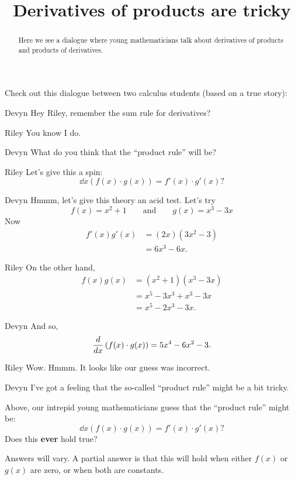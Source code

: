 \documentclass{ximera}
\title[Break-Ground:]{Derivatives of products are tricky}
\begin{document}
\begin{abstract}
Here we see a dialogue where young mathematicians talk about
derivatives of products and products of derivatives.
\end{abstract}
\maketitle

Check out this dialogue between two calculus students (based on a true
story):

\begin{dialogue}
\item[Devyn] Hey Riley, remember the sum rule for derivatives?
\item[Riley] You know I do.
\item[Devyn] What do you think that the ``product rule'' will be?
\item[Riley] Let's give this a spin:
  \[
  \dd{x} \left(f(x)\cdot g(x)\right) = f'(x) \cdot g'(x)?
  \]
\item[Devyn] Hmmm, let's give this theory an acid test. Let's try
  \[
  f(x) = x^2+1\qquad\text{and}\qquad g(x) = x^3-3x
  \]
  Now
  \begin{align*}
    f'(x)g'(x) &= (2x)(3x^2-3)\\
    &= 6x^3-6x.
  \end{align*}
\item[Riley] On the other hand,
  \begin{align*}
    f(x)g(x) &= (x^2+1)(x^3-3x)\\
    &=x^5-3x^3+x^3-3x\\
    &=x^5-2x^3-3x.
  \end{align*} 
\item[Devyn] And so, 
  \[
  \frac{d}{dx} \left(f(x) \cdot g(x)\right) = 5x^4-6x^2-3.
  \]
\item[Riley] Wow. Hmmm. It looks like our guess was incorrect.
\item[Devyn] I've got a feeling that the so-called ``product rule''
  might be a bit tricky.
\end{dialogue}

\begin{problem}
  Above, our intrepid young mathematicians guess that the ``product rule'' might be:
  \[
  \dd{x} \left(f(x)\cdot g(x)\right) = f'(x) \cdot g'(x)?
  \]
  Does this \textbf{ever} hold true?
  \begin{freeResponse}
    Answers will vary. A partial answer is that this will hold when
    either $f(x)$ or $g(x)$ are zero, or when both are constants.
  \end{freeResponse}
\end{problem}




\end{document}
